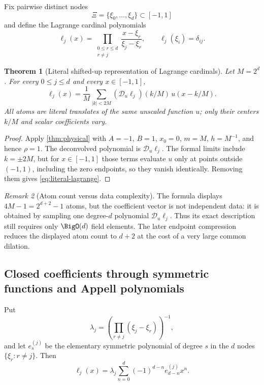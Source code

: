 \documentclass[11pt]{article}
\newtheorem{theorem}{Theorem}[section]
\theoremstyle{definition}
\theoremstyle{remark}
\newtheorem{remark}[theorem]{Remark}
\newcommand{\Dscr}{\mathscr D_{u}}
\begin{document}
Fix pairwise distinct nodes
\[
 \Xi=\{\xi_0,\ldots,\xi_d\}\subset[-1,1]
\]
and define the Lagrange cardinal polynomials
\begin{equation}
 \ell_j(x)=\prod_{\substack{0\le r\le d\\r\ne j}}
 \frac{x-\xi_r}{\xi_j-\xi_r},
 \qquad
 \ell_j(\xi_i)=\delta_{ij}.
 \label{eq:lagrange-cardinal}
\end{equation}

\begin{theorem}[Literal shifted-up representation of Lagrange cardinals]
\label{thm:literal-lagrange}
Let $M=2^d$.  For every $0\le j\le d$ and every $x\in[-1,1]$,
\begin{equation}
 \boxed{
 \ell_j(x)=\frac1M\sum_{|k|<2M}
 (\Dscr\ell_j)(k/M)\,u(x-k/M).}
 \label{eq:literal-lagrange}
\end{equation}
All atoms are literal translates of the same unscaled function $u$; only their
centers $k/M$ and scalar coefficients vary.
\end{theorem}

\begin{proof}
Apply \cref{thm:physical} with $A=-1$, $B=1$, $x_0=0$, $m=M$, $h=M^{-1}$,
and hence $\rho=1$.  The deconvolved polynomial is $\Dscr\ell_j$.  The formal
limits include $k=\pm2M$, but for $x\in[-1,1]$ those terms evaluate $u$ only at
points outside $(-1,1)$, including the zero endpoints, so they vanish
identically.  Removing them gives \eqref{eq:literal-lagrange}.
\end{proof}

\begin{remark}[Atom count versus data complexity]
The formula displays $4M-1=2^{d+2}-1$ atoms, but the coefficient vector is not
independent data: it is obtained by sampling one degree-$d$ polynomial
$\Dscr\ell_j$.  Thus its exact description still requires only $\BigO(d)$
field elements.  The later endpoint compression reduces the displayed atom
count to $d+2$ at the cost of a very large common dilation.
\end{remark}

\subsection{Closed coefficients through symmetric functions and Appell polynomials}

Put
\[
 \lambda_j=\left(\prod_{r\ne j}(\xi_j-\xi_r)\right)^{-1},
\]
and let $e_s^{(j)}$ be the elementary symmetric polynomial of degree $s$ in
the $d$ nodes $\{\xi_r:r\ne j\}$.  Then
\[
 \ell_j(x)=\lambda_j\sum_{n=0}^{d}(-1)^{d-n}e_{d-n}^{(j)}x^n.
\]
\end{document}

